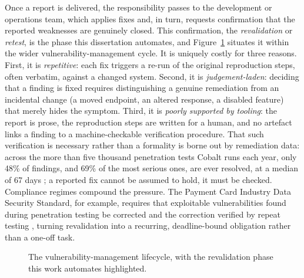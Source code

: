 Once a report is delivered, the responsibility passes to the development or
operations team, which applies fixes and, in turn, requests confirmation that the
reported weaknesses are genuinely closed. This confirmation, the
\emph{revalidation} or \emph{retest}, is the phase this dissertation
automates, and Figure~\ref{fig:lifecycle} situates it within the wider
vulnerability-management cycle. It is uniquely costly for three reasons. First, it is
\emph{repetitive}: each fix triggers a re-run of the original reproduction steps,
often verbatim, against a changed system. Second, it is \emph{judgement-laden}:
deciding that a finding is fixed requires distinguishing a genuine remediation
from an incidental change (a moved endpoint, an altered response, a disabled
feature) that merely hides the symptom. Third, it is \emph{poorly supported by
tooling}: the report is prose, the reproduction steps are written for a human, and
no artefact links a finding to a machine-checkable verification procedure. That such
verification is necessary rather than a formality is borne out by remediation data:
across the more than five thousand penetration tests Cobalt runs each year, only
48\% of findings, and 69\% of the most serious ones, are ever resolved, at a
median of 67 days \cite{cobalt_pentesting_2025}; a reported fix cannot be assumed to
hold, it must be checked. Compliance regimes compound the pressure. The Payment Card Industry Data Security
Standard, for example, requires that exploitable vulnerabilities found during
penetration testing be corrected and the correction verified by repeat testing
\cite{pcidss}, turning revalidation into a recurring, deadline-bound obligation
rather than a one-off task.

\begin{figure}[htbp]
\centering
{}
\caption[The vulnerability-management lifecycle]{The vulnerability-management lifecycle, with the revalidation phase this work automates highlighted.}
\label{fig:lifecycle}
\end{figure}

